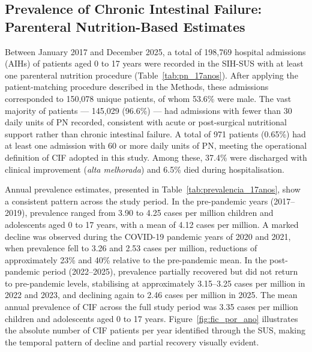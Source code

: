 \documentclass[pdflatex,sn-mathphys-num]{sn-jnl}
\theoremstyle{thmstyleone}%
\theoremstyle{thmstyletwo}%
\theoremstyle{thmstylethree}%
\begin{document}
\subsection*{Prevalence of Chronic Intestinal Failure: Parenteral Nutrition-Based Estimates}

Between January 2017 and December 2025, a total of 198,769 hospital admissions (AIHs) of patients aged 0 to 17 years were recorded in the SIH-SUS with at least one parenteral nutrition procedure (Table~\ref{tab:pn_17anos}). After applying the patient-matching procedure described in the Methods, these admissions corresponded to 150,078 unique patients, of whom 53.6\% were male. The vast majority of patients --- 145,029 (96.6\%) --- had admissions with fewer than 30 daily units of PN recorded, consistent with acute or post-surgical nutritional support rather than chronic intestinal failure. A total of 971 patients (0.65\%) had at least one admission with 60 or more daily units of PN, meeting the operational definition of CIF adopted in this study. Among these, 37.4\% were discharged with clinical improvement (\textit{alta melhorada}) and 6.5\% died during hospitalisation.

Annual prevalence estimates, presented in Table~\ref{tab:prevalencia_17anos}, show a consistent pattern across the study period. In the pre-pandemic years (2017--2019), prevalence ranged from 3.90 to 4.25 cases per million children and adolescents aged 0 to 17 years, with a mean of 4.12 cases per million. A marked decline was observed during the COVID-19 pandemic years of 2020 and 2021, when prevalence fell to 3.26 and 2.53 cases per million, reductions of approximately 23\% and 40\% relative to the pre-pandemic mean. In the post-pandemic period (2022--2025), prevalence partially recovered but did not return to pre-pandemic levels, stabilising at approximately 3.15--3.25 cases per million in 2022 and 2023, and declining again to 2.46 cases per million in 2025. The mean annual prevalence of CIF across the full study period was 3.35 cases per million children and adolescents aged 0 to 17 years. Figure~\ref{fig:fic_por_ano} illustrates the absolute number of CIF patients per year identified through the SUS, making the temporal pattern of decline and partial recovery visually evident.
\end{document}
